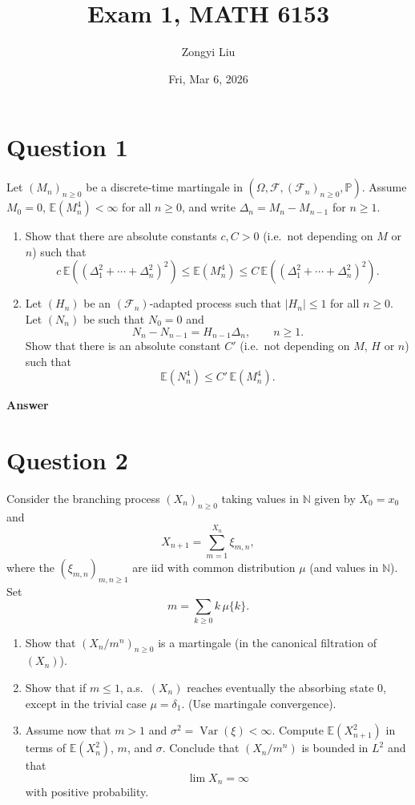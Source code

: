 \documentclass[letterpaper]{article}
\title{Exam 1, MATH 6153}
\author{Zongyi Liu}
\date{Fri, Mar 6, 2026}
\begin{document}
		\maketitle
		\section{Question 1}
		
		Let $\left(M_{n}\right)_{n \ge 0}$ be a discrete-time martingale in 
		$\left(\Omega, \mathcal{F}, (\mathcal{F}_{n})_{n \ge 0}, \mathbb{P}\right)$. 
		Assume $M_{0}=0$, $\mathbb{E}(M_{n}^{4})<\infty$ for all $n \ge 0$, and write
		$\Delta_{n}=M_{n}-M_{n-1}$ for $n \ge 1$.
		
		\begin{enumerate}
			\item[a.] Show that there are absolute constants $c, C>0$ 
			(i.e.\ not depending on $M$ or $n$) such that
			$$
			c\,\mathbb{E}\!\left((\Delta_{1}^{2}+\cdots+\Delta_{n}^{2})^{2}\right)
			\le
			\mathbb{E}\!\left(M_{n}^{4}\right)
			\le
			C\,\mathbb{E}\!\left((\Delta_{1}^{2}+\cdots+\Delta_{n}^{2})^{2}\right).
			$$
			
			\item[b.] Let $(H_n)$ be an $(\mathcal{F}_n)$-adapted process such that
			$|H_n|\le 1$ for all $n\ge 0$. Let $(N_n)$ be such that $N_0=0$ and
			$$
			N_n - N_{n-1} = H_{n-1}\Delta_n, \qquad n \ge 1.
			$$
			Show that there is an absolute constant $C'$ (i.e.\ not depending on $M$, $H$
			or $n$) such that
			$$
			\mathbb{E}(N_n^{4}) \le C'\,\mathbb{E}(M_n^{4}).
			$$
		\end{enumerate}
		
		\textbf{Answer}
		
		\clearpage
		
		\section{Question 2}
		
		Consider the branching process $(X_n)_{n \ge 0}$ taking values in $\mathbb{N}$ given by
		$X_0 = x_0$ and
		$$
		X_{n+1} = \sum_{m=1}^{X_n} \xi_{m,n},
		$$
		where the $(\xi_{m,n})_{m,n \ge 1}$ are iid with common distribution $\mu$
		(and values in $\mathbb{N}$). Set
		$$
		m = \sum_{k \ge 0} k\,\mu\{k\}.
		$$
		
		\begin{enumerate}
			\item[a.] Show that $(X_n/m^n)_{n \ge 0}$ is a martingale
			(in the canonical filtration of $(X_n)$).
			\item[b.] Show that if $m \le 1$, a.s.\ $(X_n)$ reaches eventually
			the absorbing state $0$, except in the trivial case $\mu=\delta_1$.
			(Use martingale convergence).
			
			\item[c.] Assume now that $m>1$ and $\sigma^2=\operatorname{Var}(\xi)<\infty$.
			Compute $\mathbb{E}(X_{n+1}^2)$ in terms of $\mathbb{E}(X_n^2)$, $m$, and $\sigma$.
			Conclude that $(X_n/m^n)$ is bounded in $L^2$ and that
			$$
			\lim X_n = \infty
			$$
			with positive probability.
		\end{enumerate}
		
\end{document}
